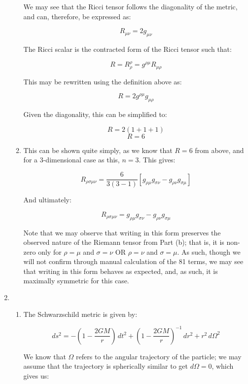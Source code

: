 \begin{enumerate}
\begin{enumerate}
        We may see that the Ricci tensor follows the diagonality of the metric, and can, therefore, be expressed as:

        $$\boxed{R_{\mu\nu}=2g_{\mu\nu}}$$

        The Ricci scalar is the contracted form of the Ricci tensor such that:

        $$R=R^{\rho}_{\rho}=g^{\rho\mu}R_{\mu\rho}$$

        This may be rewritten using the definition above as:

        $$R=2g^{\rho\mu}g_{\mu\rho}$$

        Given the diagonality, this can be simplified to:

        $$R=2(1+1+1)$$
        $$\boxed{R=6}$$

      \item 

        This can be shown quite simply, as we know that $R=6$ from above, and for a 3-dimensional case as this, $n=3$. This gives:

        $$R_{\rho\sigma\mu\nu}=\frac{6}{3(3-1)}\left[ g_{\rho\mu}g_{\sigma\nu}-g_{\rho\nu}g_{\sigma\mu} \right]$$

        And ultimately:

        $$\boxed{R_{\rho\sigma\mu\nu}=g_{\rho\mu}g_{\sigma\nu}-g_{\rho\nu}g_{\sigma\mu}}$$

        Note that we may observe that writing in this form preserves the observed nature of the Riemann tensor from Part (b); that is, it is non-zero only for $\rho=\mu$ and $\sigma=\nu$ OR $\rho=\nu$ and $\sigma=\mu$. As such, though we will not confirm through manual calculation of the 81 terms, we may see that writing in this form behaves as expected, and, as such, it is maximally symmetric for this case.

    \end{enumerate}

  \item

    \begin{enumerate}

      \item 

        The Schwarzschild metric is given by:

        $$ds^2=-\left( 1-\frac{2GM}{r} \right)\,dt^2+\left( 1-\frac{2GM}{r} \right)^{-1}\,dr^2+r^2\,d\Omega^2$$

        We know that $\Omega$ refers to the angular trajectory of the particle; we may assume that the trajectory is spherically similar to get $d\Omega=0$, which gives us:


\end{enumerate}
\end{enumerate}
